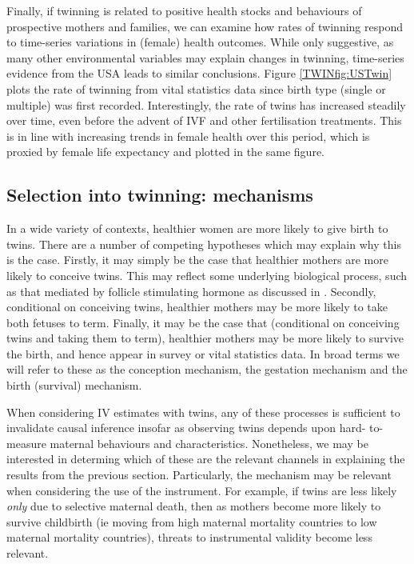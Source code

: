 \documentclass[subeqn]{article}
\begin{document}
\begin{spacing}{1.4}
Finally, if twinning is related to positive health stocks and behaviours of
prospective mothers and families, we can examine how rates of twinning respond
to time-series variations in (female) health outcomes.  While only suggestive,
as many other environmental variables may explain changes in twinning, 
time-series evidence from the USA leads to similar conclusions.  Figure
\ref{TWINfig:USTwin} plots the rate of twinning from vital statistics data since
birth type (single or multiple) was first recorded.  Interestingly, the rate of
twins has increased steadily over time, even before the advent of IVF and other
fertilisation treatments.  This is in line with increasing trends in female
health over this period, which is proxied by female life expectancy and plotted
in the same figure.


\subsection{Selection into twinning: mechanisms}   \label{TWINsscn:selection}
In a wide variety of contexts, healthier women are more likely to give birth to
twins.  There are a number of competing hypotheses which may explain why this is
the case.  Firstly, it may simply be the case that healthier mothers are more 
likely to conceive twins.  This may reflect some underlying biological process, 
such as that mediated by follicle stimulating hormone as discussed in 
\citet{Hall2003}.  Secondly, conditional on conceiving twins, healthier mothers 
may be more likely to take both fetuses to term.  Finally, it may be the case 
that (conditional on conceiving twins and taking them to term), healthier mothers 
may be more likely to survive the birth, and hence appear in survey or vital 
statistics data.  In broad terms we will refer to these as the conception 
mechanism, the gestation mechanism and the birth (survival) mechanism.

When considering IV estimates with twins, any of these processes is sufficient 
to invalidate causal inference insofar as observing twins depends upon hard-%
to-measure maternal behaviours and characteristics.  Nonetheless, we may be 
interested in determing which of these are the relevant channels in explaining 
the results from the previous section.  Particularly, the mechanism may be 
relevant when considering the use of the instrument.  For example, if twins are 
less likely \emph{only} due to selective maternal death, then as mothers become 
more likely to survive childbirth (ie moving from high maternal mortality 
countries to low maternal mortality countries), threats to instrumental validity 
become less relevant.


\end{spacing}
\end{document}
